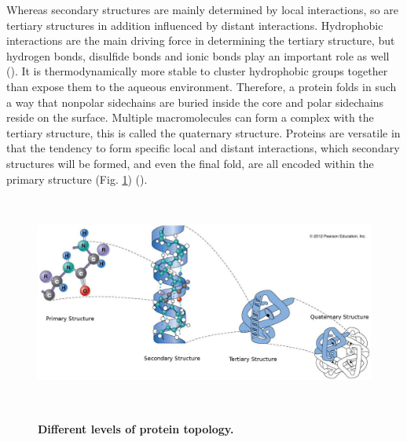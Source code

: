 Whereas secondary structures are mainly determined by local interactions, 
so are tertiary structures in addition influenced by distant interactions. 
Hydrophobic interactions are the main driving force in determining the tertiary structure, 
but hydrogen bonds, 
disulfide bonds 
and ionic bonds 
play an important role as well 
(\cite{madigan2015}). 
It is thermodynamically more stable to cluster hydrophobic groups together than expose them to the aqueous environment. 
Therefore, a protein folds in such a way that nonpolar sidechains are buried inside the core 
and polar sidechains reside on the surface.
Multiple macromolecules can form a complex with the tertiary structure, this is called the quaternary structure.
Proteins are versatile in that the tendency to form specific local and distant interactions,
which secondary structures will be formed, 
and even the final fold, 
are all encoded within the primary structure (Fig. \ref{fig:topology})
(\cite{berg2015}).


~\begin{figure}[h!]
	\includegraphics[width=\linewidth]{./literature_review/proteins/tertiary_quaternary/img/topology.jpg}
	\caption{\textbf{Different levels of protein topology.}}
	\label{fig:topology}
~\end{figure}
